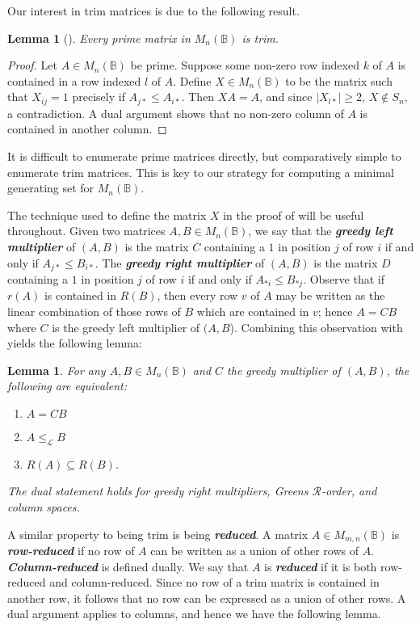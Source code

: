 \documentclass[11pt]{article}
\newtheorem{lemma}[thm]{Lemma}
\newcommand{\defn}[1]{\textbf{\textit{#1}}}
\numberwithin{equation}{section}
\newcommand{\B}{\mathbb{B}}
\newcommand{\Bn}{M_n(\B)}
\newcommand{\Bmn}{M_{m,n}(\B)}
\renewcommand{\L}{\mathscr{L}}
\newcommand{\R}{\mathscr{R}}
\begin{document}
Our interest in trim matrices is due to the following result.

\begin{lemma}[{\cite[Lemma 3.1]{Konieczny2011aa}}]
  Every prime matrix in $\Bn$ is trim.
\end{lemma}
\begin{proof}
  Let $A \in \Bn$ be prime. Suppose some non-zero row indexed $k$ of $A$ is
  contained in a row indexed $l$ of $A$. Define $X \in \Bn$ to be the matrix
  such that $X_{ij} = 1$ precisely if $A_{j*} \leq A_{i*}$. Then $XA = A$, and
  since $|X_{l*}| \geq 2$, $X \not\in S_n$, a contradiction. A dual argument
  shows that no non-zero column of $A$ is contained in another column.
\end{proof}

It is difficult to enumerate prime matrices directly, but comparatively simple
to enumerate trim matrices. This is key to our strategy for computing a minimal
generating set for $\Bn$.

The technique used to define the matrix $X$ in the proof of
 will be useful throughout. Given two matrices
$A, B \in \Bn$, we say that the \defn{greedy left multiplier} of $(A, B)$ is the
matrix $C$ containing a $1$ in position $j$ of row $i$ if and only if $A_{j*}
\leq B_{i*}$. The \defn{greedy right multiplier} of $(A, B)$ is the matrix $D$
containing a $1$ in position $j$ of row $i$ if and only if $A_{*i} \leq B_{*j}$.
Observe that if $r(A)$ is contained in $R(B)$, then every row $v$ of $A$ may be
written as the linear combination of those rows of $B$ which are contained in
$v$; hence $A = CB$ where $C$ is the greedy left multiplier of $(A, B$).
Combining this observation with  yields the
following lemma:
\begin{lemma}
  For any $A, B \in \Bn$ and $C$ the greedy multiplier of $(A, B)$, the
  following are equivalent:
  \begin{enumerate}[label={\rm (\roman*)}]
    \item $A = CB$
    \item $A \leq_\L B$
    \item $R(A) \subseteq R(B)$.
  \end{enumerate}
  The dual statement holds for greedy right multipliers, Greens $\R$-order, and
  column spaces.
\end{lemma}

A similar property to being trim is being \defn{reduced}. A matrix $A \in \Bmn$
is \defn{row-reduced} if no row of $A$ can be written as a union of other rows
of $A$. \defn{Column-reduced} is defined dually. We say that $A$ is
\defn{reduced} if it is both row-reduced and column-reduced. Since no row of a
trim matrix is contained in another row, it follows that no row can be expressed
as a union of other rows. A dual argument applies to columns, and hence we have
the following lemma.
\end{document}
